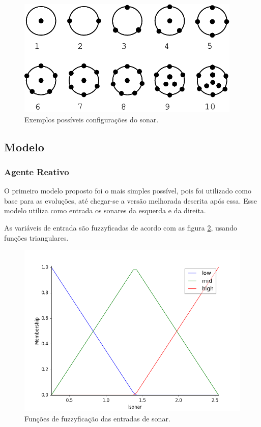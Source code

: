 \documentclass[twoside,conference,a4paper]{IEEEtran}
\begin{document}
\begin{figure}[ht]
\centering
\includegraphics[width=1\hsize]{figuras/ray_orbits.png}
\caption{Exemplos possíveis configurações do sonar.}
\label{fig:fig8}
\end{figure}

\subsection{Modelo}
\subsubsection*{Agente Reativo}
O primeiro modelo proposto foi o mais simples possível, pois foi utilizado como base para as evoluções, até chegar-se a versão melhorada descrita após essa. Esse modelo utiliza como entrada os sonares da esquerda e da direita.

As variáveis de entrada são fuzzyficadas de acordo com as figura \ref{fig:sonar-fuzzy0}, usando funções triangulares.

\begin{figure}[ht]
\centering
\includegraphics[width=1\hsize]{figuras/sonar_fuzzy0.png}
\caption{Funções de fuzzyficação das entradas de sonar.}
\label{fig:sonar-fuzzy0}
\end{figure}
\end{document}
